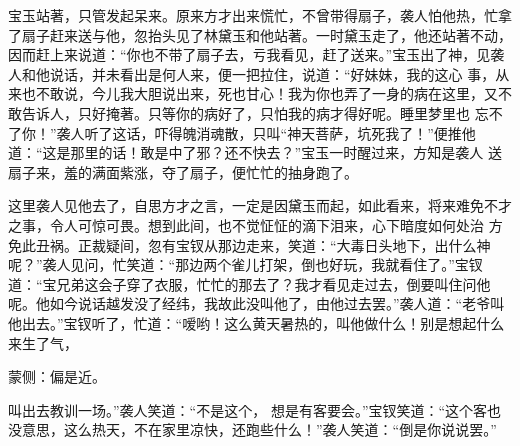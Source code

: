 \begin{parag}
    宝玉站著，只管发起呆来。原来方才出来慌忙，不曾带得扇子，袭人怕他热，忙拿了扇子赶来送与他，忽抬头见了林黛玉和他站著。一时黛玉走了，他还站著不动，因而赶上来说道：“你也不带了扇子去，亏我看见，赶了送来。”宝玉出了神，见袭人和他说话，并未看出是何人来，便一把拉住，说道：“好妹妹，我的这心 事，从来也不敢说，今儿我大胆说出来，死也甘心！我为你也弄了一身的病在这里，又不敢告诉人，只好掩著。只等你的病好了，只怕我的病才得好呢。睡里梦里也 忘不了你！”袭人听了这话，吓得魄消魂散，只叫“神天菩萨，坑死我了！”便推他道：“这是那里的话！敢是中了邪？还不快去？”宝玉一时醒过来，方知是袭人 送扇子来，羞的满面紫涨，夺了扇子，便忙忙的抽身跑了。
\end{parag}


\begin{parag}
    这里袭人见他去了，自思方才之言，一定是因黛玉而起，如此看来，将来难免不才之事，令人可惊可畏。想到此间，也不觉怔怔的滴下泪来，心下暗度如何处治 方免此丑祸。正裁疑间，忽有宝钗从那边走来，笑道：“大毒日头地下，出什么神呢？”袭人见问，忙笑道：“那边两个雀儿打架，倒也好玩，我就看住了。”宝钗道：“宝兄弟这会子穿了衣服，忙忙的那去了？我才看见走过去，倒要叫住问他呢。他如今说话越发没了经纬，我故此没叫他了，由他过去罢。”袭人道：“老爷叫 他出去。”宝钗听了，忙道：“嗳哟！这么黄天暑热的，叫他做什么！别是想起什么来生了气，\begin{note}蒙侧：偏是近。\end{note}叫出去教训一场。”袭人笑道：“不是这个， 想是有客要会。”宝钗笑道：“这个客也没意思，这么热天，不在家里凉快，还跑些什么！”袭人笑道：“倒是你说说罢。”
\end{parag}


